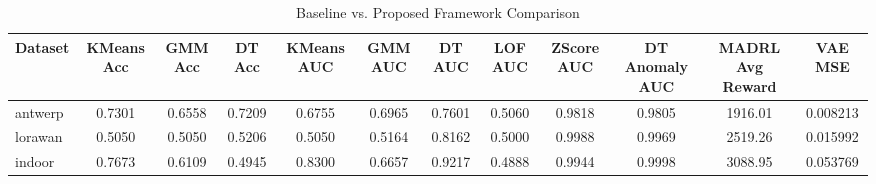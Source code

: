 \begin{table}[h]
\centering
\caption{Baseline vs. Proposed Framework Comparison}
\label{tab:results}
\begin{tabular}{lccccccccccc}
\hline
Dataset & KMeans Acc & GMM Acc & DT Acc & KMeans AUC & GMM AUC & DT AUC & LOF AUC & ZScore AUC & DT Anomaly AUC & MADRL Avg Reward & VAE MSE \\
\hline
antwerp & 0.7301 & 0.6558 & 0.7209 & 0.6755 & 0.6965 & 0.7601 & 0.5060 & 0.9818 & 0.9805 & 1916.01 & 0.008213 \\
lorawan & 0.5050 & 0.5050 & 0.5206 & 0.5050 & 0.5164 & 0.8162 & 0.5000 & 0.9988 & 0.9969 & 2519.26 & 0.015992 \\
indoor & 0.7673 & 0.6109 & 0.4945 & 0.8300 & 0.6657 & 0.9217 & 0.4888 & 0.9944 & 0.9998 & 3088.95 & 0.053769 \\
\hline
\end{tabular}
\end{table}
